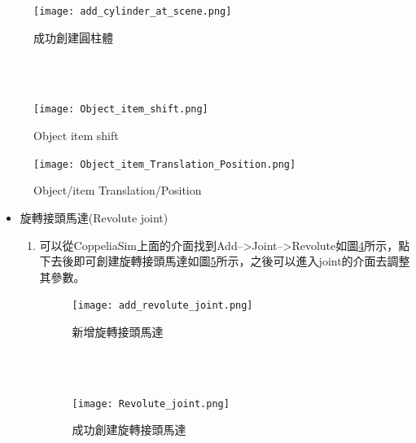 \documentclass[14pt,a4paper]{report}  %
\begin{document}
{{{\begin{itemize}
\begin{enumerate}
      \begin{figure}[hbt!]
        \centering
        \texttt{[image: add\_cylinder\_at\_scene.png]} 
        \caption{成功創建圓柱體}
        \label{fig_add_cylinder_at_scene:scale}
      \end{figure}
      \hspace*{\fill} \\
      \hspace*{\fill} \\
      
      \begin{figure}[hbt!]
        \centering
        \texttt{[image: Object\_item\_shift.png]}
        \caption{Object item shift}
        \label{fig_Object_item_shift:scale}
      \end{figure}
        
      \begin{figure}[hbt!]
        \centering
        \texttt{[image: Object\_item\_Translation\_Position.png]}
        \caption{Object/item Translation/Position}
        \label{fig_Object_item_Translation_Position.png:scale}
        \end{figure}      
      
      	\end{enumerate}
      \end{itemize}
      
      \begin{itemize}
      \item 旋轉接頭馬達(Revolute joint)
      	\begin{enumerate}
      	\item{可以從CoppeliaSim上面的介面找到Add-->Joint-->Revolute如圖\ref{fig_add_revolute_joint:scale}所示，點下去後即可創建旋轉接頭馬達如圖\ref{fig_Revolute_joint:scale}所示，之後可以進入joint的介面去調整其參數。}
      		
      \begin{figure}[hbt!]
        \centering
        \texttt{[image: add\_revolute\_joint.png]}
        \caption{新增旋轉接頭馬達}
        \label{fig_add_revolute_joint:scale}
      \end{figure}
      \hspace*{\fill} \\
      \hspace*{\fill} \\
      
      \begin{figure}[hbt!]
        \centering
        \texttt{[image: Revolute\_joint.png]}
        \caption{成功創建旋轉接頭馬達}
        \label{fig_Revolute_joint:scale}
      \end{figure}
      

\end{enumerate}
\end{itemize}}}}
\end{document}
